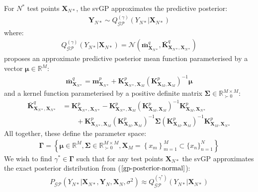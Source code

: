\documentclass{article}
\newcommand{\GP}{\operatorname{\mathcal{GP}}}
\numberwithin{equation}{section}
\begin{document}
For $N^*$ test points $\mathbf{X}_{N*}$, the svGP approximates the predictive posterior:
\begin{align}
    \mathbf{Y}_{N*} \sim Q_{\GP}^{(\gamma)}\left(Y_{N*} \vert \mathbf{X}_{N*}\right)
\end{align}
where:
\begin{align}
    Q_{\GP}^{(\gamma)}\left(Y_{N*} \vert \mathbf{X}_{N*}\right) = \mathcal{N}\left(\bar{\mathbf{m}}_{\mathbf{X}_{N*}}^{q}, \bar{\mathbf{K}}_{\mathbf{X}_{N*}, \mathbf{X}_{N*}}^{q}\right)
\end{align}
\cite{titsias2009variational} proposes an approximate predictive posterior mean function parameterised by a vector $\boldsymbol{\mu} \in \mathbb{R}^M$:
\begin{align}
    \label{svgp-mean} 
    \bar{\mathbf{m}}_{\mathbf{X}_{N*}}^{q} = \mathbf{m}^p_{\mathbf{X}_{N*}} + \mathbf{K}^p_{\mathbf{X}_{N*}, \mathbf{X}_M}\left(\mathbf{K}^p_{\mathbf{X}_M,\mathbf{X}_M}\right)^{-1} \boldsymbol{\mu}
\end{align}
and a kernel function parameterised by a positive definite matrix $\mathbf{\Sigma} \in \mathbb{R}^{M\times M}_{\succ 0}$:
\begin{align}
\bar{\mathbf{K}}_{\mathbf{X}_{N*}, \mathbf{X}_{N*}}^{q} & = \mathbf{K}^p_{\mathbf{X}_{N*}, \mathbf{X}_{N*}} - \mathbf{K}^p_{\mathbf{X}_{N*}, \mathbf{X}_M} \left(\mathbf{K}^p_{\mathbf{X}_M, \mathbf{X}_M}\right)^{-1}\mathbf{K}^p_{\mathbf{X}_M, \mathbf{X}_{N*}} \nonumber \\
&\qquad + \mathbf{K}^p_{\mathbf{X}_{N*}, \mathbf{X}_M}  \left(\mathbf{K}^p_{\mathbf{X}_M, \mathbf{X}_M}\right)  ^{-1} \mathbf{\Sigma} \left(\mathbf{K}^p_{\mathbf{X}_M, \mathbf{X}_M}\right)^{-1}\mathbf{K}^p_{\mathbf{X}_M, \mathbf{X}_{N*}}
\label{svgp-covariance}
\end{align}
All together, these define the parameter space:
\begin{align}
    \mathbf{\Gamma} = \left\{\boldsymbol{\mu} \in \mathbb{R}^{M}, \mathbf{\Sigma} \in \mathbb{R}^{M\times M}_{\succ 0}, \mathbf{X}_M = \left\{x_m\right\}_{m=1}^{M} \subset \{x_n\}_{n=1}^{N}\right\}
    \label{svgp-parameter-space}
\end{align}
We wish to find $\gamma^* \in \mathbf{\Gamma}$ such that for any test points $\mathbf{X}_{N*}$ the svGP approximates the exact posterior distribution from ($\ref{gp-posterior-normal}$):
\begin{align}
    P_{\GP}\left(Y_{N*} \vert \mathbf{X}_{N*}, \mathbf{Y}_N, \mathbf{X}_N, \sigma^2 \right) \approx Q_{\GP}^{(\gamma^*)}\left(Y_{N*} \vert \mathbf{X}_{N*}\right)
    \label{svgp-desired-approximation}
\end{align}
\end{document}
